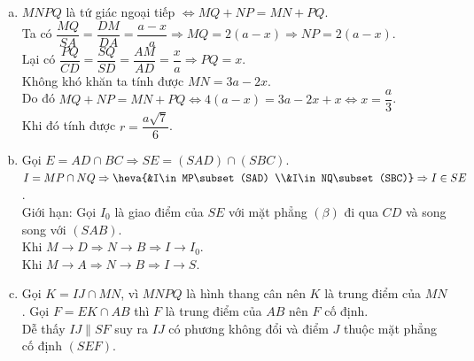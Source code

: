 \begin{ex}
{\begin{enumerate}[a)]
			$\Rightarrow PQ\parallel  CD \qquad(2)$.\\
			Lại có $AB\parallel CD \qquad(3)$.\\ 
			Từ $(1)$,  $(2)$ và $(3)$ ta có
			$MN\parallel AB\parallel CD\parallel PQ$ nên $MNPQ$ là hình  thang\qquad (*).\\
			Dễ thấy rằng $MQ\parallel SA$, $NP\parallel  SB$.\\
			Do đó $\dfrac{MQ}{SA}=\dfrac{DM}{DA};\dfrac{NP}{SB}=\dfrac{CN}{CB}$ mà $\dfrac{DM}{DA}=\dfrac{CN}{CB}$ nên $\dfrac{MQ}{SA}=\dfrac{NP}{SB}$.\\ 
			 Mặt khác $\Delta SAB$ cân tại $S\Rightarrow SA=SB\Rightarrow MQ=NP \qquad(**)$.\\
			 Từ $(*)$ và $(**)$ suy ra $MNPQ$ là hình thang cân.
			\item $MNPQ$ là tứ  giác ngoại tiếp $\Leftrightarrow MQ+NP=MN+PQ$.\\
			Ta có  $\dfrac{MQ}{SA}=\dfrac{DM}{DA}=\dfrac{a-x}{a}\Rightarrow MQ=2\left(a-x\right)\Rightarrow NP=2\left(a-x\right)$.\\
			Lại có  $\dfrac{PQ}{CD}=\dfrac{SQ}{SD}=\dfrac{AM}{AD}=\dfrac{x}{a}\Rightarrow PQ=x$.\\
			Không khó khăn ta tính  được $MN=3a-2x$.\\
			Do đó $MQ+NP=MN+PQ\Leftrightarrow 4\left(a-x\right)=3a-2x+x\Leftrightarrow x=\dfrac{a}{3}$.\\ 
			Khi đó tính được  $r=\dfrac{a\sqrt{7}}{6}$.
			\item Gọi $E=AD\cap BC\Rightarrow SE=(SAD)\cap (SBC)$.\\ 
			$I=MP\cap NQ\Rightarrow \heva{&I\in MP\subset (SAD) \\&I\in NQ\subset (SBC)}\Rightarrow  I\in SE$.\\
			 Giới hạn:
			Gọi $I_0$ là giao điểm của $SE$ với mặt phẳng $(\beta)$ đi qua $CD$  và song song với $(SAB)$.\\
			Khi  $M\to D\Rightarrow N\to B\Rightarrow I\to I_0$.\\
			Khi $M\to A\Rightarrow  N\to B\Rightarrow I\to S$.\\
			\item Gọi $K=IJ\cap MN$, vì $MNPQ$ là hình thang cân nên $K$ là trung điểm của $MN$. Gọi $F=EK\cap AB$ thì $F$ là trung điểm của $AB$ nên $F$  cố định.\\
			Dễ thấy $IJ\parallel SF$ suy ra $IJ$ có phương không đổi và điểm $J$ thuộc  mặt phẳng cố định $(SEF)$.
		\end{enumerate}
	} 
\end{ex}

